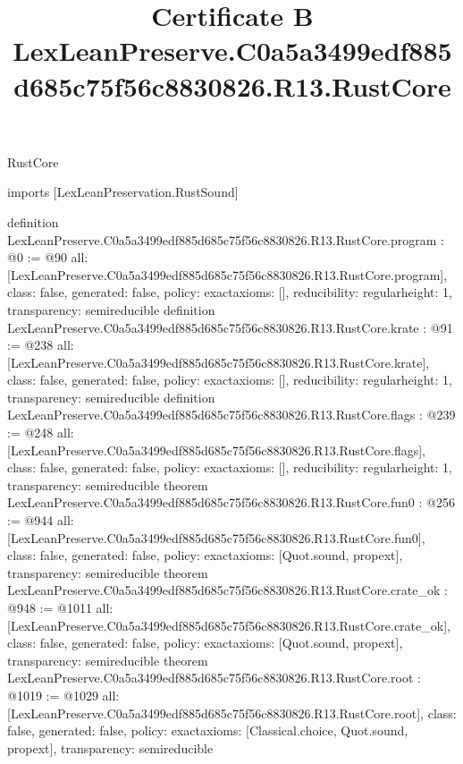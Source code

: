 \begin{lexlean}{RustCore}
\title{Certificate B LexLeanPreserve.C0a5a3499edf885d685c75f56c8830826.R13.RustCore}
\begin{coremodule}
imports [LexLeanPreservation.RustSound]

definition LexLeanPreserve.C0a5a3499edf885d685c75f56c8830826.R13.RustCore.program : @0 := @90 {
  all: [LexLeanPreserve.C0a5a3499edf885d685c75f56c8830826.R13.RustCore.program],
  class: false,
  generated: false,
  policy: exact{axioms: []},
  reducibility: regular{height: 1},
  transparency: semireducible
}
definition LexLeanPreserve.C0a5a3499edf885d685c75f56c8830826.R13.RustCore.krate : @91 := @238 {
  all: [LexLeanPreserve.C0a5a3499edf885d685c75f56c8830826.R13.RustCore.krate],
  class: false,
  generated: false,
  policy: exact{axioms: []},
  reducibility: regular{height: 1},
  transparency: semireducible
}
definition LexLeanPreserve.C0a5a3499edf885d685c75f56c8830826.R13.RustCore.flags : @239 := @248 {
  all: [LexLeanPreserve.C0a5a3499edf885d685c75f56c8830826.R13.RustCore.flags],
  class: false,
  generated: false,
  policy: exact{axioms: []},
  reducibility: regular{height: 1},
  transparency: semireducible
}
theorem LexLeanPreserve.C0a5a3499edf885d685c75f56c8830826.R13.RustCore.fun0 : @256 := @944 {
  all: [LexLeanPreserve.C0a5a3499edf885d685c75f56c8830826.R13.RustCore.fun0],
  class: false,
  generated: false,
  policy: exact{axioms: [Quot.sound, propext]},
  transparency: semireducible
}
theorem LexLeanPreserve.C0a5a3499edf885d685c75f56c8830826.R13.RustCore.crate_ok : @948 := @1011 {
  all: [LexLeanPreserve.C0a5a3499edf885d685c75f56c8830826.R13.RustCore.crate_ok],
  class: false,
  generated: false,
  policy: exact{axioms: [Quot.sound, propext]},
  transparency: semireducible
}
theorem LexLeanPreserve.C0a5a3499edf885d685c75f56c8830826.R13.RustCore.root : @1019 := @1029 {
  all: [LexLeanPreserve.C0a5a3499edf885d685c75f56c8830826.R13.RustCore.root],
  class: false,
  generated: false,
  policy: exact{axioms: [Classical.choice, Quot.sound, propext]},
  transparency: semireducible
}


\end{coremodule}
\end{lexlean}
